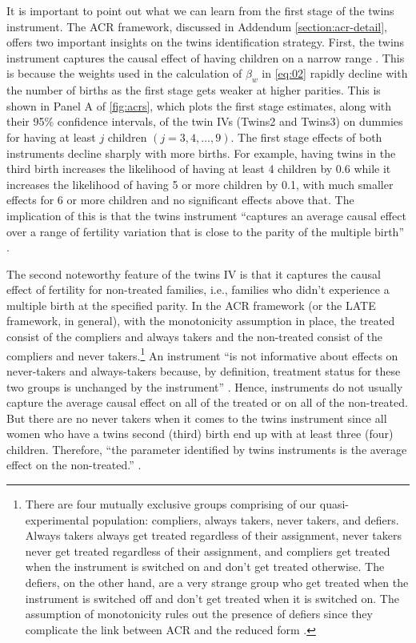  

It is important to point out what we can learn from the first stage of the twins instrument. The ACR framework, discussed in Addendum \ref{section:acr-detail}, offers two important insights on the twins identification strategy. First, the twins instrument captures the causal effect of having children on a narrow range \parencite{angrist_multiple_2010}. This is because the weights used in the calculation of $ \beta_{w} $ in \eqref{eq:02} rapidly decline with the number of births as the first stage gets weaker at higher parities. This is shown in Panel A of \autoref{fig:acrs}, which plots the first stage estimates, along with their 95\% confidence intervals, of the twin IVs (Twins2 and Twins3) on dummies for having at least $ j $ children $ (j = 3, 4, \dots, 9) $. The first stage effects of both instruments decline sharply with more births. For example, having twins in the third birth increases the likelihood of having at least 4 children by 0.6 while it increases the likelihood of having 5 or more children by 0.1, with much smaller effects for 6 or more children and no significant effects above that.  The implication of this is that the twins instrument \enquote{captures an average causal effect over a range of fertility variation that is close to the parity of the multiple birth} \parencite[p.~788]{angrist_multiple_2010}. 

The second noteworthy feature of the twins IV is that it captures the causal effect of fertility for non-treated families, i.e., families who didn't experience a multiple birth at the specified parity. In the ACR framework (or the LATE framework, in general), with the monotonicity assumption in place, the treated consist of the compliers and always takers and the non-treated consist of the compliers and never takers.\footnote{ There are four mutually exclusive groups comprising of our quasi-experimental population: compliers, always takers, never takers, and defiers\parencite{angrist_identification_1996}. Always takers always get treated regardless of their assignment, never takers never get treated regardless of their assignment, and compliers get treated when the instrument is switched on and don't get treated otherwise. The defiers, on the other hand, are a very strange group who get treated when the instrument is switched off and don't get treated when it is switched on. The assumption of monotonicity rules out the presence of defiers since they complicate the link between ACR and the reduced form \parencite{Angrist2009}. } An instrument \enquote{is not informative about effects on never-takers and always-takers because, by definition, treatment status for these two groups is unchanged by the instrument} \parencite[p.~158]{Angrist2009}. Hence, instruments do not usually capture the average causal effect on all of the treated or on all of the non-treated. But there are no never takers when it comes to the twins instrument since all women who have a twins second (third) birth end up with at least three (four) children. Therefore, \enquote{the parameter identified by twins instruments is the average effect on the non-treated.} \parencite[p.~788]{angrist_multiple_2010}.


